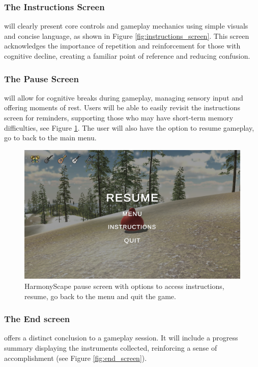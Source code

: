 \documentclass{l4proj}
\begin{document}
\subsubsection{The Instructions Screen} will clearly present core controls and gameplay mechanics using simple visuals and concise language, as shown in Figure \ref{fig:instructions_screen}. This screen acknowledges the importance of repetition and reinforcement for those with cognitive decline, creating a familiar point of reference and reducing confusion.

\subsubsection{The Pause Screen} will allow for cognitive breaks during gameplay, managing sensory input and offering moments of rest. Users will be able to easily revisit the instructions screen for reminders, supporting those who may have short-term memory difficulties, see Figure \ref{fig:pause_screen}. The user will also have the option to resume gameplay, go to back to the main menu.

\begin{figure}[h]
 \centering
 \includegraphics[width=0.7\linewidth]{dissertation/images/pause_screen.png} 
 \caption{HarmonyScape pause screen with options to access instructions, resume, go back to the menu and quit the game.}
 \label{fig:pause_screen} 
\end{figure}

\subsubsection{The End screen} offers a distinct conclusion to a gameplay session. It will include a progress summary displaying the instruments collected, reinforcing a sense of accomplishment (see Figure \ref{fig:end_screen}).
\end{document}
